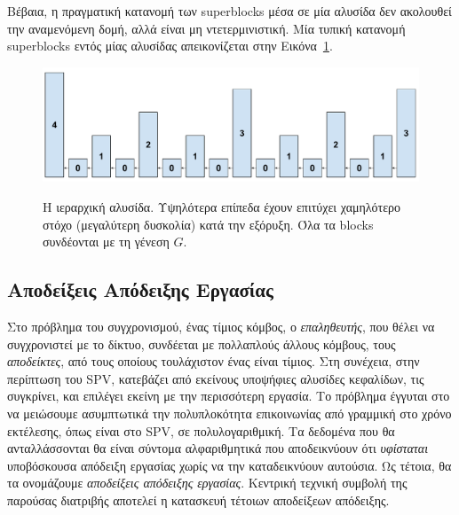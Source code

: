 Βέβαια, η πραγματική κατανομή των superblocks μέσα σε μία αλυσίδα δεν ακολουθεί την αναμενόμενη δομή,
αλλά είναι μη ντετερμινιστική. Μία τυπική κατανομή superblocks εντός μίας αλυσίδας απεικονίζεται στην
Εικόνα~\ref{fig.hierarchy2}.

\begin{figure}
  \caption{Η ιεραρχική αλυσίδα.
  Υψηλότερα επίπεδα έχουν επιτύχει χαμηλότερο στόχο (μεγαλύτερη δυσκολία) κατά την
  εξόρυξη. Όλα τα blocks συνδέονται με τη γένεση $G$.}
  \centering
  \includegraphics[width=0.7\columnwidth,keepaspectratio]{chapters/work/figures/hierarchical-chain-tall.pdf}
  \label{fig.hierarchy2}
\end{figure}

\subsection*{Αποδείξεις Απόδειξης Εργασίας}

Στο πρόβλημα του συγχρονισμού, ένας τίμιος κόμβος, ο \emph{επαληθευτής}, που θέλει να συγχρονιστεί με το δίκτυο,
συνδέεται με πολλαπλούς άλλους κόμβους, τους \emph{αποδείκτες}, από τους
οποίους τουλάχιστον ένας είναι τίμιος. Στη συνέχεια, στην περίπτωση του SPV, κατεβάζει από εκείνους
υποψήφιες αλυσίδες κεφαλίδων, τις συγκρίνει, και επιλέγει εκείνη με την περισσότερη εργασία. Το
πρόβλημα έγγυται στο να μειώσουμε ασυμπτωτικά την πολυπλοκότητα επικοινωνίας από γραμμική στο χρόνο
εκτέλεσης, όπως είναι στο SPV, σε πολυλογαριθμική. Τα δεδομένα που θα ανταλλάσσονται θα είναι σύντομα
αλφαριθμητικά που αποδεικνύουν ότι \emph{υφίσταται} υποβόσκουσα απόδειξη εργασίας χωρίς να την καταδεικνύουν
αυτούσια. Ως τέτοια, θα τα ονομάζουμε \emph{αποδείξεις απόδειξης εργασίας}. Κεντρική τεχνική συμβολή της
παρούσας διατριβής αποτελεί η κατασκευή τέτοιων αποδείξεων απόδειξης.


